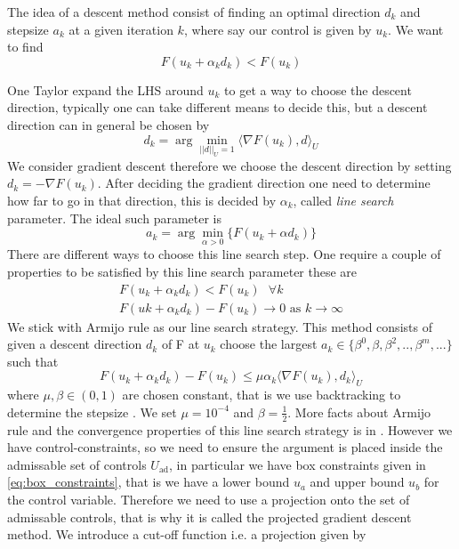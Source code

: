 The idea of a descent method consist of finding an optimal direction $d_k$ and stepsize $a_k$ at a given iteration $k$, where say our control is given by $u_k$. We want to find
\begin{equation*}
    F(u_k + \alpha_kd_k) < F(u_k)
\end{equation*}

One Taylor expand the LHS around $u_k$ to get a way to choose the descent direction, typically one can take different means to decide this, but a descent direction can in general be chosen by 
\begin{equation*}
    d_k = \arg\min_{||d||_U=1} \langle \nabla F(u_k), d \rangle_U
\end{equation*}
We consider gradient descent therefore we choose the descent direction by setting $d_k = -\nabla F(u_k)$. After deciding the gradient direction one need to determine how far to go in that direction, this is decided by $\alpha_k$, called \textit{line search} parameter. The ideal such parameter is 
\begin{equation*}
    a_k = \arg \min_{\alpha>0} \{ F(u_k + \alpha d_k) \}
\end{equation*}
There are different ways to choose this line search step. One require a couple of properties to be satisfied by this line search parameter these are
\begin{align*}
    F(u_k + \alpha_kd_k) < F(u_k) \text{  } \forall k \\
    F(uk + \alpha_k d_k) - F(u_k) \rightarrow 0 \text{ as } k\rightarrow \infty
\end{align*}
We stick with Armijo rule as our line search strategy. This method consists of given a descent direction $d_k$ of F at $u_k$ choose the largest $a_k \in \{ \beta^0, \beta, \beta^2,..,\beta^m,... \}$ such that
\begin{equation}\label{eq:armijo}
    F (u_k + \alpha_kd_k) - F(u_k) \leq \mu \alpha_k \langle \nabla F(u_k),d_k \rangle_{U}
\end{equation}
where $\mu,\beta  \in (0,1)$ are chosen constant, that is we use backtracking to determine the stepsize \cite{iterativeMethods}. We set $\mu = 10^{-4}$ and $\beta = \frac{1}{2}$. More facts about Armijo rule and the convergence properties of this line search strategy is in \cite{numMethods} \cite{iterativeMethods}. However we have control-constraints, so we need to ensure the argument is placed inside the admissable set of controls $U_{\textrm{ad}}$, in particular we have box constraints given in \eqref{eq:box_constraints}, that is we have a lower bound $u_a$ and upper bound $u_b$ for the control variable. Therefore we need to use a projection onto the set of admissable controls, that is why it is called the projected gradient descent method. We introduce a cut-off function i.e. a projection given by
